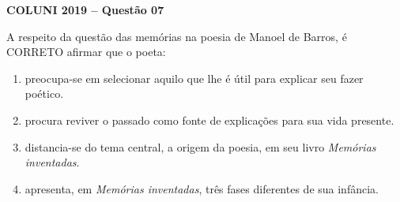 \textbf{COLUNI 2019 -- Questão 07}\par\medskip A respeito da questão das memórias na poesia de Manoel de Barros, é CORRETO afirmar que o poeta:\begin{enumerate}
\item preocupa-se em selecionar aquilo que lhe é útil para explicar seu fazer poético.
\item procura reviver o passado como fonte de explicações para sua vida presente.
\item distancia-se do tema central, a origem da poesia, em seu livro \textit{Memórias inventadas}.
\item apresenta, em \textit{Memórias inventadas}, três fases diferentes de sua infância.\end{enumerate}
